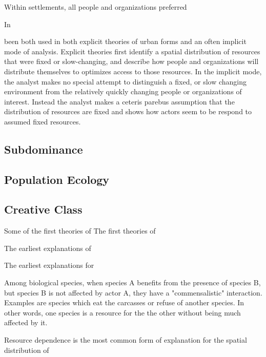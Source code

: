 Within settlements, all people and organizations
preferred 



In 



 been both used in both explicit theories of
urban forms and an often implicit mode of analysis. Explicit theories
first identify a spatial distribution of resources that were fixed or
slow-changing, and describe how people and organizations will
distribute themselves to optimizes access to those resources. In the
implicit mode, the analyst makes no special attempt to distinguish a
fixed, or slow changing environment from the relatively quickly
changing people or organizations of interest. Instead the analyst
makes a ceteris parebus assumption that the distribution of resources
are fixed and shows how actors seem to be respond to assumed fixed resources.



\subsection*{Subdominance}

\subsection*{Population Ecology}

\subsection*{Creative Class}

Some of the first theories of The first theories of 

The earliest explanations of 

The earliest explanations for 


Among biological species, when species A benefits from the presence of
species B, but species B is not affected by actor A, they have a
"commensalistic" interaction. Examples are species which eat the
carcasses or refuse of another species. In other words, one species is
a resource for the the other without being much affected by it. 

Resource dependence is the most common form of explanation for the
spatial distribution of


